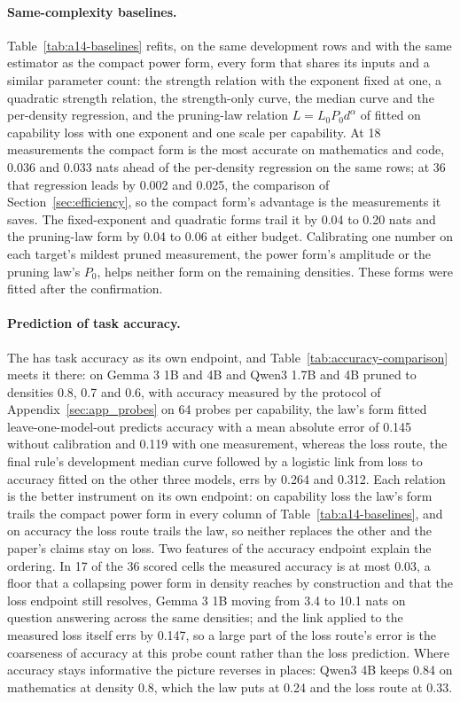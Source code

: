 \paragraph{Same-complexity baselines.} Table~\ref{tab:a14-baselines} refits, on the same development
rows and with the same estimator as the compact power form, every form that shares its inputs and a
similar parameter count: the strength relation with the exponent fixed at one, a quadratic strength
relation, the strength-only curve, the median curve and the per-density regression, and the
pruning-law relation $L=L_0P_0d^{\alpha}$ of \citet{sengupta2025compression} fitted on capability
loss with one exponent and one scale per capability. At 18 measurements the compact form is the most accurate on mathematics and code, 0.036 and 0.033
nats ahead of the per-density regression on the same rows; at 36 that regression leads by 0.002 and
0.025, the comparison of Section~\ref{sec:efficiency}, so the compact form's advantage is the
measurements it saves. The fixed-exponent and quadratic forms trail it by 0.04 to 0.20 nats and the
pruning-law form by 0.04 to 0.06 at either budget. Calibrating one number
on each target's mildest pruned measurement, the power form's amplitude or the pruning law's $P_0$,
helps neither form on the remaining densities. These forms were fitted after the confirmation.


\paragraph{Prediction of task accuracy.} The  has task accuracy as its own endpoint, and
Table~\ref{tab:accuracy-comparison} meets it there: on Gemma 3 1B and 4B and Qwen3 1.7B and 4B
pruned to densities 0.8, 0.7 and 0.6, with accuracy measured by the protocol of
Appendix~\ref{sec:app_probes} on 64 probes per capability, the law's form fitted leave-one-model-out
predicts accuracy with a mean absolute error of 0.145 without calibration and
0.119 with one measurement, whereas the loss route, the final rule's development
median curve followed by a logistic link from loss to accuracy fitted on the other three models, errs by
0.264 and 0.312. Each relation is the better instrument on its own
endpoint: on capability loss the law's form trails the compact power form in every column of
Table~\ref{tab:a14-baselines}, and on accuracy the loss route trails the law, so neither replaces the
other and the paper's claims stay on loss. Two features of the accuracy endpoint explain the
ordering. In 17 of the 36 scored cells the measured accuracy is at most 0.03, a floor that a
collapsing power form in density reaches by construction and that the loss endpoint still resolves,
Gemma 3 1B moving from 3.4 to 10.1 nats on question answering across the same densities; and the link
applied to the measured loss itself errs by 0.147, so a large part of the loss
route's error is the coarseness of accuracy at this probe count rather than the loss prediction.
Where accuracy stays informative the picture reverses in places: Qwen3 4B keeps 0.84 on
mathematics at density 0.8, which the law puts at 0.24 and the loss route at 0.33.


